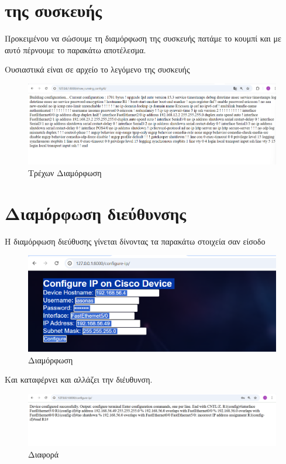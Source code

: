 \section{ της συσκευής}

Προκειμένου να σώσουμε τη διαμόρφωση της συσκευής πατάμε το κουμπί
 και με αυτό πέρνουμε το παρακάτω αποτέλεσμα.

Ουσιαστικά είναι σε  αρχείο το λεγόμενο 
της συσκευής

\FloatBarrier

\begin{figure}[h]
	\centering
	\includegraphics[width=1.0\textwidth]{graphics/running_config.png}
	\caption{Τρέχων Διαμόρφωση}
\end{figure}


\section{Διαμόρφωση διεύθυνσης }

Η διαμόρφωση  διεύθυσης γίνεται δίνοντας τα παρακάτω στοιχεία
σαν είσοδο

\FloatBarrier

\begin{figure}[h]
	\centering
	\includegraphics[width=1.0\textwidth]{graphics/configure_ip.png}
	\caption{Διαμόρφωση}
\end{figure}

Και καταφέρνει και αλλάζει την διέυθυνση.

\FloatBarrier

\begin{figure}[h]
	\centering
	\includegraphics[width=1.0\textwidth]{graphics/configure_ip_1.png}
	\caption{ Διαφορά}
\end{figure}